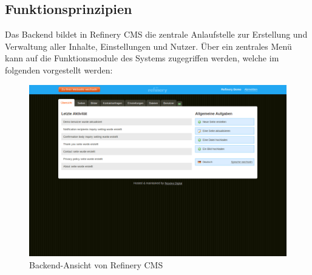 \subsection{Funktionsprinzipien}
Das Backend bildet in Refinery CMS die zentrale Anlaufstelle zur Erstellung und Verwaltung aller Inhalte, Einstellungen und Nutzer. Über ein zentrales Menü kann auf die Funktionsmodule des Systems zugegriffen werden, welche im folgenden vorgestellt werden:
\begin{figure}[!h]
\begin{center}
\includegraphics[scale=0.3]{images/analyse/refinery/backendrefinery.png}
\caption{Backend-Ansicht von Refinery CMS}
\label{refinerybackend}
\end{center}
\end{figure}

